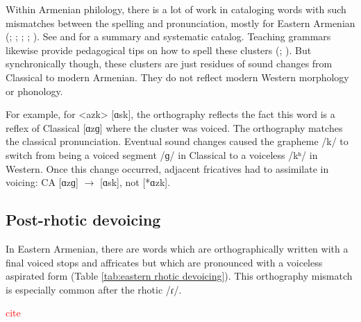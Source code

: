 Within Armenian philology, there is a lot of work in cataloging words with such mismatches between the spelling and pronunciation, mostly for Eastern Armenian (\citealt[242-4]{Adjarian-1971-LiakatarPhono}; \citealt[29]{Minassian-1980-EastArmenianGrammar};  \citealt[62,74]{Soukyasyan-2004-ArmenianPhonology}; \citealt[21]{Avetisyan-2007-ComparativeGrammar};  \citealt[30]{Avetisyan-2011-ComparativePhonoEastWest}). See \citet[59]{Hovhannisyan-2014-ArmenianSyllable} and \citet[185]{Gharagulyan-1974-BookArmenianOrthoepy} for a summary and systematic catalog.  Teaching grammars likewise provide pedagogical tips on how to spell these clusters (\citealt[75]{Ezekyan-2007-Armenian}; \citealt[92]{Sevak-2009-Coursebook}). But synchronically though, these clusters are just residues of sound changes from Classical to modern Armenian. They do not reflect modern Western morphology or phonology. 

For example, for   <azk> [ɑsk], the orthography reflects the fact this word is a reflex of Classical [ɑzɡ] where the cluster was voiced. The orthography matches the classical pronunciation. Eventual sound changes caused the grapheme  /k/ to switch from being a voiced segment /ɡ/ in Classical to a voiceless /kʰ/ in Western. Once this change occurred, adjacent fricatives had to assimilate in voicing: CA [ɑzɡ] $\rightarrow$ [ɑsk], not [*ɑzk]. 

\subsection{Post-rhotic devoicing}\label{section:ortho:mismatch:rhoticdevoicing}
In Eastern Armenian, there are words which are orthographically written with a final voiced stops and affricates but which are pronounced with a voiceless aspirated form (Table \ref{tab:eastern rhotic devoicing}). This orthography mismatch is especially common after the rhotic /ɾ/.  

\textcolor{red}{cite}

